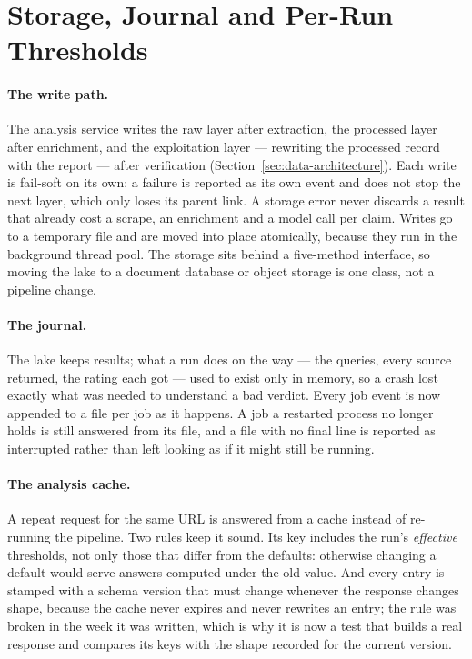 
\section{Storage, Journal and Per-Run Thresholds}
\label{sec:dev-storage}

\paragraph{The write path.} The analysis service writes the raw layer
after extraction, the processed layer after enrichment, and the
exploitation layer --- rewriting the processed record with the report
--- after verification (Section~\ref{sec:data-architecture}). Each
write is fail-soft on its own: a failure is reported as its own event
and does not stop the next layer, which only loses its parent link. A
storage error never discards a result that already cost a scrape, an
enrichment and a model call per claim. Writes go to a temporary file
and are moved into place atomically, because they run in the
background thread pool. The storage sits behind a five-method interface,
so moving the lake to a document database or object storage is one
class, not a pipeline change.

\paragraph{The journal.} The lake keeps results; what a run does on the
way --- the queries, every source returned, the rating each got --- used
to exist only in memory, so a crash lost exactly what was needed to
understand a bad verdict. Every job event is now appended to a file per
job as it happens. A job a restarted process no longer holds is still
answered from its file, and a file with no final line is reported as
interrupted rather than left looking as if it might still be running.

\paragraph{The analysis cache.} A repeat request for the same URL is
answered from a cache instead of re-running the pipeline. Two rules keep
it sound. Its key includes the run's \emph{effective} thresholds, not
only those that differ from the defaults: otherwise changing a default
would serve answers computed under the old value. And every entry is
stamped with a schema version that must change whenever the response
changes shape, because the cache never expires and never rewrites an
entry; the rule was broken in the week it was written, which is why it
is now a test that builds a real response and compares its keys with
the shape recorded for the current version.

